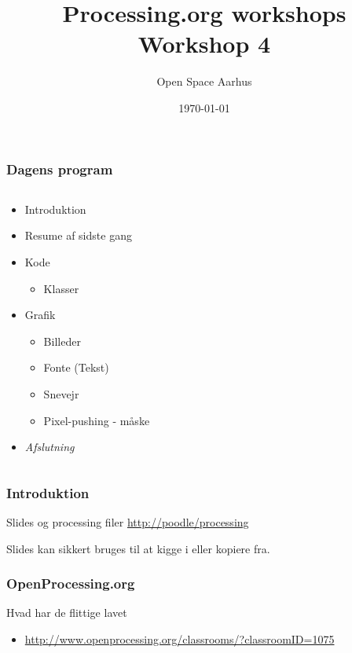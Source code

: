 \documentclass{beamer}
\title{Processing.org workshops\\Workshop 4}
\author{Open Space Aarhus}
\date{\today}
\institute[Bryggervej 30]{Bryggervej 30, 8240 Århus N}
\newcommand{\FIG}[2]{
  \begin{figure}[]
    \centering
    \texttt{[image: \#1]}
    \caption{#2}
    \label{fig:#1}
  \end{figure}
}
\begin{document}
\begin{frame}[label=titlepage]
  \titlepage
\end{frame}

\begin{frame}
  \frametitle{Dagens program}
  \begin{columns}
    \begin{column}{0.5\textwidth}
  
  \begin{itemize}
  \item Introduktion
  \item Resume af sidste gang
  \item Kode
    \begin{itemize}
    \item Klasser
    \end{itemize}

  \item Grafik
    \begin{itemize}
    \item Billeder
    \item Fonte (Tekst)
    \item Snevejr
    \item Pixel-pushing - måske
    \end{itemize}

  \item \emph{Afslutning}
  \end{itemize}						

    \end{column}
    
  \end{columns}
    
\end{frame}


\begin{frame}
  \frametitle{Introduktion}
  
  \begin{block}{Slides og processing filer}
    \url{http://poodle/processing}   
  \end{block}
  {\tiny Slides kan sikkert bruges til at kigge i eller kopiere fra.}
\end{frame}


\begin{frame}
  \frametitle{OpenProcessing.org}
  \begin{block}{Hvad har de flittige lavet}
    \begin{itemize}
    \item \url{http://www.openprocessing.org/classrooms/?classroomID=1075}
    \end{itemize}
  \end{block}
\end{frame}
\end{document}
